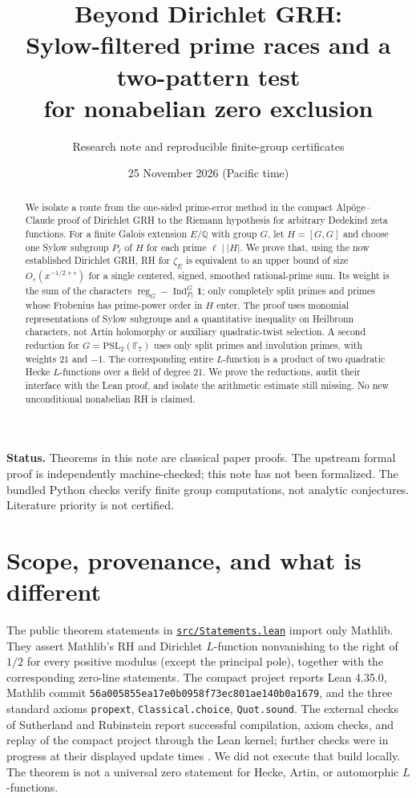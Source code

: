 \documentclass[11pt]{article}
\title{\color{ink}\bfseries Beyond Dirichlet GRH:\\Sylow-filtered prime races and a two-pattern test\\for nonabelian zero exclusion}
\author{Research note and reproducible finite-group certificates}
\date{25 November 2026 (Pacific time)}
\theoremstyle{remark}\newtheorem{remark}[theorem]{Remark}
\newcommand{\Q}{\mathbb Q}
\newcommand{\Ind}{\operatorname{Ind}}
\newcommand{\Reg}{\operatorname{reg}}
\newcommand{\one}{\mathbf{1}}
\newcommand{\src}[1]{\href{https://github.com/lsernau/grh-lean/blob/72fead102f663d5c7a407964a13dc0cf9d977207/grh-compact/#1}{\nolinkurl{#1}}}
\begin{document}
\maketitle
\begin{abstract}
We isolate a route from the one-sided prime-error method in the compact Alp\"oge--Claude proof of Dirichlet GRH to the Riemann hypothesis for arbitrary Dedekind zeta functions. For a finite Galois extension $E/\Q$ with group $G$, let $H=[G,G]$ and choose one Sylow subgroup $P_\ell$ of $H$ for each prime $\ell\mid |H|$. We prove that, using the now established Dirichlet GRH, RH for $\zeta_E$ is equivalent to an upper bound of size $O_\varepsilon(x^{-1/2+\varepsilon})$ for a single centered, signed, smoothed rational-prime sum. Its weight is the sum of the characters $\Reg_G-\Ind_{P_\ell}^{G}\one$; only completely split primes and primes whose Frobenius has prime-power order in $H$ enter. The proof uses monomial representations of Sylow subgroups and a quantitative inequality on Heilbronn characters, not Artin holomorphy or auxiliary quadratic-twist selection. A second reduction for $G=\mathrm{PSL}_2(\mathbb F_7)$ uses only split primes and involution primes, with weights $21$ and $-1$. The corresponding entire $L$-function is a product of two quadratic Hecke $L$-functions over a field of degree 21. We prove the reductions, audit their interface with the Lean proof, and isolate the arithmetic estimate still missing. No new unconditional nonabelian RH is claimed.
\end{abstract}
\vspace{.4em}
\noindent\textbf{Status.} Theorems in this note are classical paper proofs. The upstream formal proof is independently machine-checked; this note has not been formalized. The bundled Python checks verify finite group computations, not analytic conjectures. Literature priority is not certified.
\setcounter{tocdepth}{1}
\tableofcontents
\newpage
\section{Scope, provenance, and what is different}
The public theorem statements in \src{src/Statements.lean} import only Mathlib. They assert Mathlib's RH and Dirichlet $L$-function nonvanishing to the right of $1/2$ for every positive modulus (except the principal pole), together with the corresponding zero-line statements. The compact project reports Lean 4.35.0, Mathlib commit \texttt{56a005855ea17e0b0958f73ec801ae140b0a1679}, and the three standard axioms \texttt{propext}, \texttt{Classical.choice}, \texttt{Quot.sound}. The external checks of Sutherland and Rubinstein report successful compilation, axiom checks, and replay of the compact project through the Lean kernel; further checks were in progress at their displayed update times \cite{sernau,sutherland,rubinstein}. We did not execute that build locally. The theorem is not a universal zero statement for Hecke, Artin, or automorphic $L$-functions.
\end{document}

